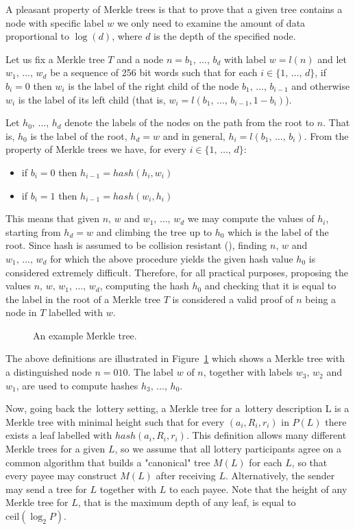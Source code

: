 \documentclass[a4paper]{article}
\begin{document}
    A pleasant property of Merkle trees is that to prove that a given tree contains a node with specific label $w$
    we only need to examine the amount of data proportional to $\log(d)$, where $d$ is the depth of the specified node.

    Let us fix a Merkle tree $T$ and a node $n = b_1,\,\ldots,\,b_d$ with label $w = l(n)$ and let $w_1,\,\ldots,\,w_d$
    be a sequence of 256 bit words such that for each $i \in \{1,\,\ldots,\,d\}$, if $b_i = 0$ then $w_i$ is the label
    of the right child of the node $b_1,\,\ldots,\, b_{i-1}$ and otherwise $w_i$ is the label of its left child
    (that is, $w_i = l(b_1, \,\ldots,\,b_{i-1}, 1 - b_i)$).

    Let $h_0,\,\ldots,\, h_d$ denote the labels of the nodes on the path from the root to $n$. That is, $h_0$ is
    the label of the root, $h_d = w$ and in general, $h_i = l(b_1,\,\ldots,\,b_i)$. From the property of Merkle trees
    we have, for every $i \in \{1,\,\ldots,\,d\}$:
    \begin{itemize}
        \item if $b_i = 0$ then $h_{i-1} = hash(h_i, w_i)$
        \item if $b_i = 1$ then $h_{i-1} = hash(w_i, h_i)$
    \end{itemize}
    This means that given $n,\, w$ and $w_1,\,\ldots,\,w_d$ we may compute the values of $h_i$, starting from $h_d = w$
    and climbing the tree up to $h_0$ which is the label of the root. Since hash is assumed to be collision resistant
    (\cite{SHA3}), finding $n$, $w$ and $w_1,\,\ldots,\,w_d$ for which the above procedure yields the given
    hash value $h_0$ is considered extremely difficult. Therefore, for all practical purposes, proposing the values
    $n,\,w,\,w_1,\,\ldots,\,w_d$, computing the hash $h_0$ and checking that it is equal to the label in the root of
    a Merkle tree $T$ is considered a valid proof of $n$ being a node in $T$ labelled with $w$.

    \begin{figure}
        
        \caption{An example Merkle tree.}
        \label{fig:merkle}
    \end{figure}

    The above definitions are illustrated in Figure~\ref{fig:merkle} which shows a Merkle tree with a distinguished
    node $n = 010$. The label $w$ of $n$, together with labels $w_3$, $w_2$ and $w_1$, are used to compute hashes
    $h_3, \,\ldots, \,h_0$.


    Now, going back the~lottery setting, a Merkle tree for a~lottery description L is a Merkle tree with minimal height
    such that for every $(a_i, R_i, r_i)$ in $P(L)$ there exists a leaf labelled with $hash(a_i, R_i, r_i)$.
    This definition allows many different Merkle trees for a given $L$, so we assume that all lottery participants
    agree on a common algorithm that builds a "canonical" tree $M(L)$ for each $L$, so that every payee may construct
    $M(L)$ after receiving $L$. Alternatively, the sender may send a tree for $L$ together with $L$ to each payee.
    Note that the height of any Merkle tree for $L$, that is the maximum depth of any leaf, is equal to
    $\text{ceil}(\log_2 P)$.
\end{document}
